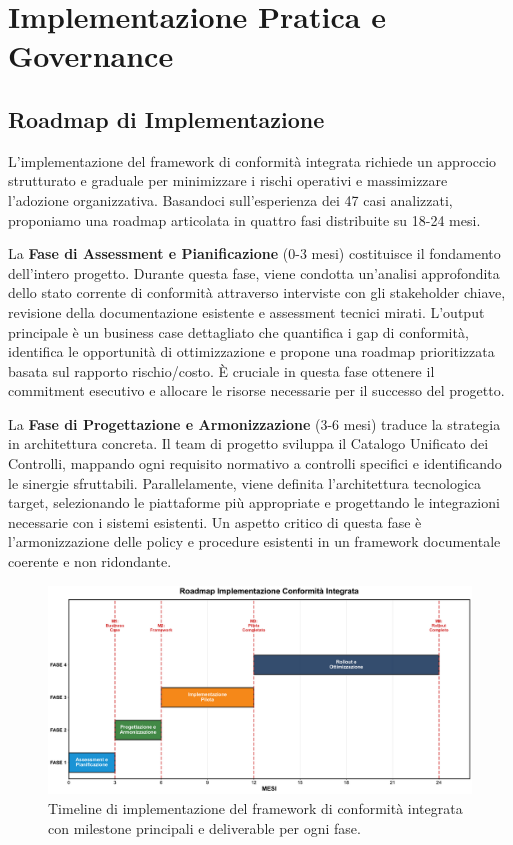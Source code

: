 \section{\texorpdfstring{Implementazione Pratica e Governance}{4.5 - Implementazione Pratica e Governance}}
\label{sec:4.5_implementazione}

\subsection{\texorpdfstring{Roadmap di Implementazione}{4.5.1 - Roadmap di Implementazione}}
\label{subsec:4.5.1_roadmap}

L'implementazione del framework di conformità integrata richiede un approccio strutturato e graduale per minimizzare i rischi operativi e massimizzare l'adozione organizzativa. Basandoci sull'esperienza dei 47 casi analizzati, proponiamo una roadmap articolata in quattro fasi distribuite su 18-24 mesi.

La \textbf{Fase di Assessment e Pianificazione} (0-3 mesi) costituisce il fondamento dell'intero progetto. Durante questa fase, viene condotta un'analisi approfondita dello stato corrente di conformità attraverso interviste con gli stakeholder chiave, revisione della documentazione esistente e assessment tecnici mirati. L'output principale è un business case dettagliato che quantifica i gap di conformità, identifica le opportunità di ottimizzazione e propone una roadmap prioritizzata basata sul rapporto rischio/costo. È cruciale in questa fase ottenere il commitment esecutivo e allocare le risorse necessarie per il successo del progetto.

La \textbf{Fase di Progettazione e Armonizzazione} (3-6 mesi) traduce la strategia in architettura concreta. Il team di progetto sviluppa il Catalogo Unificato dei Controlli, mappando ogni requisito normativo a controlli specifici e identificando le sinergie sfruttabili. Parallelamente, viene definita l'architettura tecnologica target, selezionando le piattaforme più appropriate e progettando le integrazioni necessarie con i sistemi esistenti. Un aspetto critico di questa fase è l'armonizzazione delle policy e procedure esistenti in un framework documentale coerente e non ridondante.

\begin{figure}[h]
\centering
\includegraphics[width=\textwidth]{thesis_figures/cap4/figura_4_6_timeline_LARGE.pdf}
\caption{Timeline di implementazione del framework di conformità integrata con milestone principali e deliverable per ogni fase.}
\label{fig:timeline}
\end{figure}

